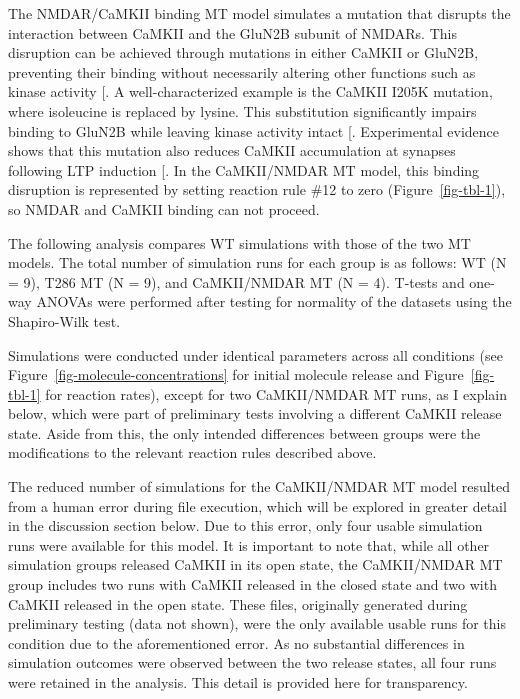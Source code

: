 \documentclass[
  11pt,
  letterpaper,
]{scrreprt}
\begin{document}
The NMDAR/CaMKII binding MT model simulates a mutation that disrupts the
interaction between CaMKII and the GluN2B subunit of NMDARs. This
disruption can be achieved through mutations in either CaMKII or GluN2B,
preventing their binding without necessarily altering other functions
such as kinase activity {[}\citeproc{ref-sanhueza2013CaMKII}{9}{]}. A
well-characterized example is the CaMKII I205K mutation, where
isoleucine is replaced by lysine. This substitution significantly
impairs binding to GluN2B while leaving kinase activity intact
{[}\citeproc{ref-bayer2001Interactiona}{127}{]}. Experimental evidence
shows that this mutation also reduces CaMKII accumulation at synapses
following LTP induction {[}\citeproc{ref-bayer2001Interactiona}{127}{]}.
In the CaMKII/NMDAR MT model, this binding disruption is represented by
setting reaction rule \#12 to zero (Figure~\ref{fig-tbl-1}), so NMDAR
and CaMKII binding can not proceed.

The following analysis compares WT simulations with those of the two MT
models. The total number of simulation runs for each group is as
follows: WT (N = 9), T286 MT (N = 9), and CaMKII/NMDAR MT (N = 4).
T-tests and one-way ANOVAs were performed after testing for normality of
the datasets using the Shapiro-Wilk test.

Simulations were conducted under identical parameters across all
conditions (see Figure~\ref{fig-molecule-concentrations} for initial
molecule release and Figure~\ref{fig-tbl-1} for reaction rates), except
for two CaMKII/NMDAR MT runs, as I explain below, which were part of
preliminary tests involving a different CaMKII release state. Aside from
this, the only intended differences between groups were the
modifications to the relevant reaction rules described above.

The reduced number of simulations for the CaMKII/NMDAR MT model resulted
from a human error during file execution, which will be explored in
greater detail in the discussion section below. Due to this error, only
four usable simulation runs were available for this model. It is
important to note that, while all other simulation groups released
CaMKII in its open state, the CaMKII/NMDAR MT group includes two runs
with CaMKII released in the closed state and two with CaMKII released in
the open state. These files, originally generated during preliminary
testing (data not shown), were the only available usable runs for this
condition due to the aforementioned error. As no substantial differences
in simulation outcomes were observed between the two release states, all
four runs were retained in the analysis. This detail is provided here
for transparency.
\end{document}

